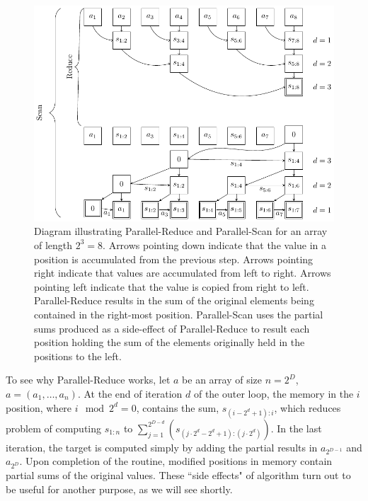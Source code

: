 \begin{figure}
\includegraphics[width=\textwidth]{diagram}
\caption{Diagram illustrating Parallel-Reduce and Parallel-Scan for an array of length $2^3=8$. Arrows pointing down indicate that the value in a position is accumulated from the previous step. Arrows pointing right indicate that values are accumulated from left to right. Arrows pointing left indicate that the value is copied from right to left. Parallel-Reduce results in the sum of the original elements being contained in the right-most position. Parallel-Scan uses the partial sums produced as a side-effect of Parallel-Reduce to result each position holding the sum of the elements originally held in the positions to the left.}
\label{scan-illustration}
\end{figure}

To see why Parallel-Reduce works, let $a$ be an array of size $n=2^D$, $a=(a_1,\ldots,a_n)$. At the end of iteration $d$ of the outer loop, the memory in the $i$ position, where $i \mod 2^d =0$, contains the sum, $s_{(i-2^d+1):i}$, which reduces problem of computing $s_{1:n}$ to $\sum_{j=1}^{2^{D-d}}(s_{(j\cdot 2^d-2^d+1):(j\cdot 2^d)})$. In the last iteration, the target is computed simply by adding the partial results in $a_{2^{D-1}}$ and $a_{2^{D}}$. Upon completion of the routine, modified positions in memory contain partial sums of the original values. These ``side effects" of algorithm turn out to be useful for another purpose, as we will see shortly. 


